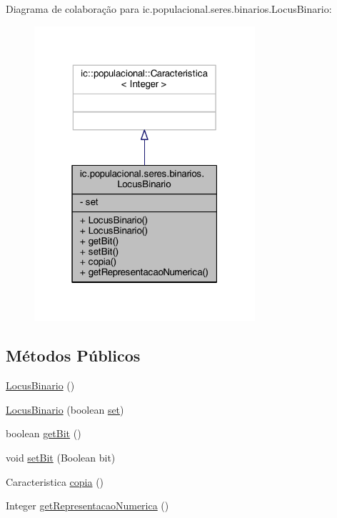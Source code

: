 Diagrama de colaboração para ic.\-populacional.\-seres.\-binarios.\-Locus\-Binario\-:
\nopagebreak
\begin{figure}[H]
\begin{center}
\leavevmode
\includegraphics[width=232pt]{classic_1_1populacional_1_1seres_1_1binarios_1_1_locus_binario__coll__graph}
\end{center}
\end{figure}
\subsection*{Métodos Públicos}
\begin{DoxyCompactItemize}
\item 
\hyperlink{classic_1_1populacional_1_1seres_1_1binarios_1_1_locus_binario_a6b51af0fcba0ee9a574f2ec0e2db1b24}{Locus\-Binario} ()
\item 
\hyperlink{classic_1_1populacional_1_1seres_1_1binarios_1_1_locus_binario_aae04767ee00bd5c01de5bc024ade604b}{Locus\-Binario} (boolean \hyperlink{classic_1_1populacional_1_1seres_1_1binarios_1_1_locus_binario_abf7737f18e4a6602f7efdbdfa40d0bf7}{set})
\item 
boolean \hyperlink{classic_1_1populacional_1_1seres_1_1binarios_1_1_locus_binario_a0afc88c8a85163f632005affcabf2723}{get\-Bit} ()
\item 
void \hyperlink{classic_1_1populacional_1_1seres_1_1binarios_1_1_locus_binario_a3534e43918842ff4ccb48279d51fb80a}{set\-Bit} (Boolean bit)
\item 
Caracteristica \hyperlink{classic_1_1populacional_1_1seres_1_1binarios_1_1_locus_binario_a6446b59f5c5c3bf36db3fde5eda1d522}{copia} ()
\item 
Integer \hyperlink{classic_1_1populacional_1_1seres_1_1binarios_1_1_locus_binario_a39e4340f584dd0710e44f044c45d0417}{get\-Representacao\-Numerica} ()
\end{DoxyCompactItemize}
